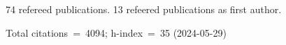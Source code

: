 74 refereed publications. 13 refeered publications as first author.

Total citations~=~4094; h-index~=~35 (2024-05-29)